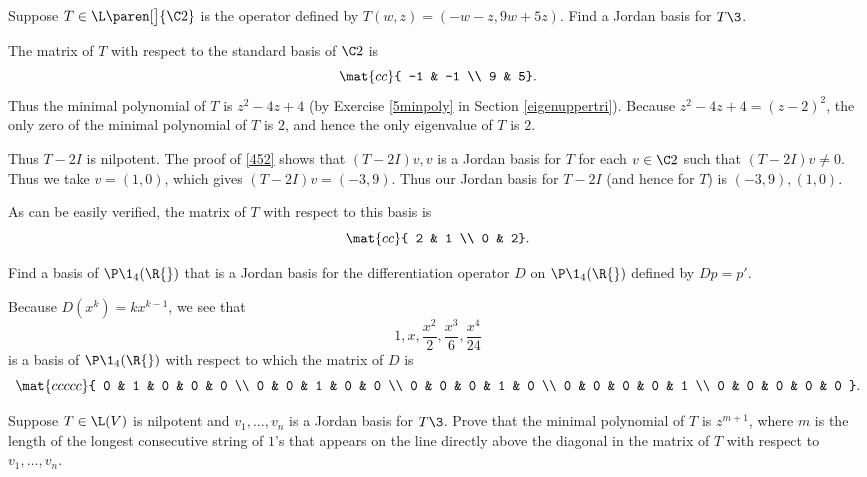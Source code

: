 \exercise
Suppose $T \in \L\paren[\big]{\C2}$ is the operator defined by $T(w, z) = (-w - z, 9w + 5z)$. Find a Jordan basis for $T\3$.

\begin{Solution}
The matrix of $T$ with respect to the standard basis of $\C2$ is
\[
\mat{cc}{
-1 & -1 \\
9 & 5}.
\]
Thus the minimal polynomial of $T$ is $z^2 -4z + 4$ (by Exercise \ref{5minpoly} in Section \ref{eigenuppertri}). Because
$z^2 -4z + 4 = (z-2)^2$, the only zero of the minimal polynomial of $T$ is $2$, and hence the only eigenvalue of $T$ is $2$.

Thus $T - 2I$ is nilpotent. The proof of \ref{452} shows that $(T-2I)v, v$ is a Jordan basis for $T$ for each $v \in \C2$ such that $(T-2I)v \ne 0$. Thus we take $v = (1,0)$, which gives $(T-2I)v = (-3, 9)$. Thus our Jordan basis for $T-2I$ (and hence for $T$) is $(-3,9), (1,0)$.

As can be easily verified, the matrix of $T$ with respect to this basis is
\[
\mat{cc}{
2 & 1 \\
0 & 2}.
\]
\end{Solution}

\exercise
Find a basis of $\P\1_4(\R{})$ that is a Jordan basis for the differentiation operator $D$ on $\P\1_4(\R{})$ defined by $Dp = p'$.

\begin{Solution}
Because $D(x^k) = k x^{k-1}$, we see that
\[
1, x, \frac{x^2}{2}, \frac{x^3}{6}, \frac{x^4}{24}
\]
is a basis of $\P\1_4(\R{})$ with respect to which the matrix of $D$ is
\[
\mat{ccccc}{
0 & 1 & 0 & 0 & 0 \\
0 & 0 & 1 & 0 & 0 \\
0 & 0 & 0 & 1 & 0 \\
0 & 0 & 0 & 0 & 1 \\
0 & 0 & 0 & 0 & 0
}.
\]
\end{Solution}

\exercise
Suppose $T \in \L(V)$ is nilpotent and $v_1, \ldots, v_n$ is a Jordan basis for $T\3$.  Prove that the minimal polynomial of $T$ is
$z^{m+1}$, where $m$ is the length of the longest consecutive string of $1$'s that
appears on the line directly above the diagonal in the matrix of $T$ with respect to
$v_1, \ldots, v_n$. \label{nilmin}

